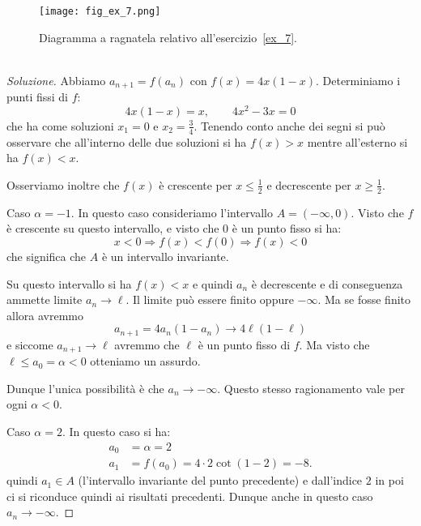 \newsavebox{\qrexsette}
\begin{figure}
   \begin{center}
    \texttt{[image: fig\_ex\_7.png]}
  \end{center}
  \caption{Diagramma a ragnatela relativo
    all'esercizio~\ref{ex_7}.
    \ifwidemargin\\\\\fi%
    \usebox{\qrexsette}}
  \label{fig_ex_7}
\end{figure}

\begin{proof}[Soluzione]
  Abbiamo $a_{n+1} = f(a_n)$ con $f(x) = 4x(1-x)$. 
  Determiniamo i punti
  fissi di $f$:
  \[
  4x(1-x)= x, \qquad 4 x^2 - 3x = 0
  \]
  che ha come soluzioni $x_1=0$ e $x_2=\frac 3 4$. 
  Tenendo conto anche dei segni si può
  osservare che all'interno delle due soluzioni si ha $f(x)>x$ mentre
  all'esterno si ha $f(x)<x$.

  Osserviamo inoltre che $f(x)$ è crescente per
  $x\le \frac 1 2$ e decrescente per $x\ge \frac 1 2$.

  Caso $\alpha=-1$. In questo caso consideriamo l'intervallo
  $A=(-\infty, 0)$. Visto che $f$ è crescente su questo intervallo,
  e visto che $0$ è un punto fisso si ha:
  \[
  x < 0 \Rightarrow f(x) < f(0) \Rightarrow f(x) < 0
  \]
  che significa che $A$ è un intervallo invariante.

  Su questo intervallo si ha $f(x)<x$ e quindi $a_n$ è decrescente e
  di conseguenza ammette limite $a_n\to \ell$. Il limite può essere
  finito oppure $-\infty$. Ma se fosse finito allora avremmo
  \[
  a_{n+1} = 4 a_n (1-a_n) \to 4 \ell (1-\ell)
  \]
  e siccome $a_{n+1}\to \ell$ avremmo che $\ell$
  è un punto fisso di $f$. 
  Ma visto che $\ell \le a_0 = \alpha < 0$
  otteniamo un assurdo.

  Dunque l'unica possibilità è che $a_n \to -\infty$. Questo
  stesso ragionamento vale per ogni $\alpha<0$.

  Caso $\alpha=2$. In questo caso si ha:
  \begin{align*}
    a_0 &= \alpha = 2\\
    a_1 &= f(a_0) = 4\cdot 2\cot (1-2) = -8.
  \end{align*}
  quindi $a_1 \in A$ (l'intervallo invariante del punto precedente) e
  dall'indice $2$ in poi ci si riconduce quindi ai risultati
  precedenti. Dunque anche in questo caso $a_n \to -\infty$.


\end{proof}
